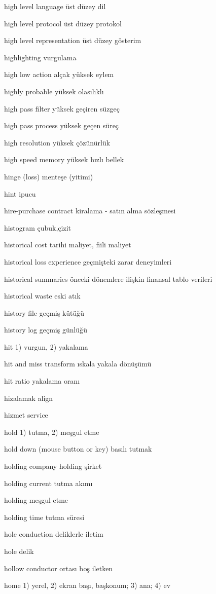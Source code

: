 \documentclass[12pt,fleqn]{article}\usepackage{../../common}
\begin{document}
high level language üst düzey dil

high level protocol üst düzey protokol

high level representation üst düzey gösterim

highlighting vurgulama

high low action alçak yüksek eylem

highly probable yüksek olasılıklı

high pass filter yüksek geçiren süzgeç

high pass process yüksek geçen süreç

high resolution yüksek çözünürlük

high speed memory yüksek hızlı bellek

hinge (loss) menteşe (yitimi)

hint ipucu

hire-purchase contract kiralama - satın alma sözleşmesi

histogram çubuk,çizit

historical cost tarihi maliyet, fiili maliyet

historical loss experience geçmişteki zarar deneyimleri

historical summaries önceki dönemlere ilişkin finansal tablo verileri

historical waste eski atık

history file geçmiş kütüğü

history log geçmiş günlüğü

hit 1) vurgun, 2) yakalama

hit and miss transform ıskala yakala dönüşümü

hit ratio yakalama oranı

hizalamak align

hizmet service

hold 1) tutma, 2) meşgul etme

hold down (mouse button or key) basılı tutmak

holding company holding şirket

holding current tutma akımı

holding meşgul etme

holding time tutma süresi

hole conduction deliklerle iletim

hole delik

hollow conductor ortası boş iletken

home 1) yerel, 2) ekran başı, başkonum; 3) ana; 4) ev
\end{document}
